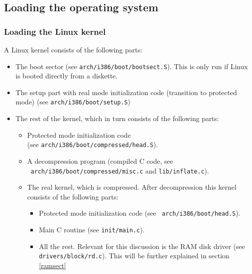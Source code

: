 \documentclass[12pt,a4paper]{article}
\begin{document}
\subsection{Loading the operating system}

\subsubsection{Loading the Linux kernel}

A Linux kernel consists of the following parts:
\begin{itemize}
\item The boot sector (see {\tt arch/i386/boot/bootsect.S}). This is only
  run if Linux is booted directly from a diskette.
\item The setup part with real mode initialization code (transition to
  protected mode) (see {\tt arch/i386/boot/setup.S})
\item The rest of the kernel, which in turn consists of the following parts:
\begin{itemize}
\item Protected mode initialization code \\
(see {\tt arch/i386/boot/compressed/head.S}). 
\item A decompression program (compiled C code, see \\{\tt
  arch/i386/boot/compressed/misc.c} and {\tt lib/inflate.c}). 
\item The real kernel, which is compressed. After decompression this
  kernel consists of the following parts:
  \begin{itemize}
  \item Protected mode initialization code (see {\tt
  arch/i386/boot/head.S}).
  \item Main C routine (see {\tt init/main.c}).
  \item All the rest. Relevant for this discussion is the RAM disk driver 
   (see {\tt drivers/block/rd.c}). This will be further explained in
   section \ref{ramsect}
  \end{itemize}
\end{itemize}
\end{itemize}
\end{document}
